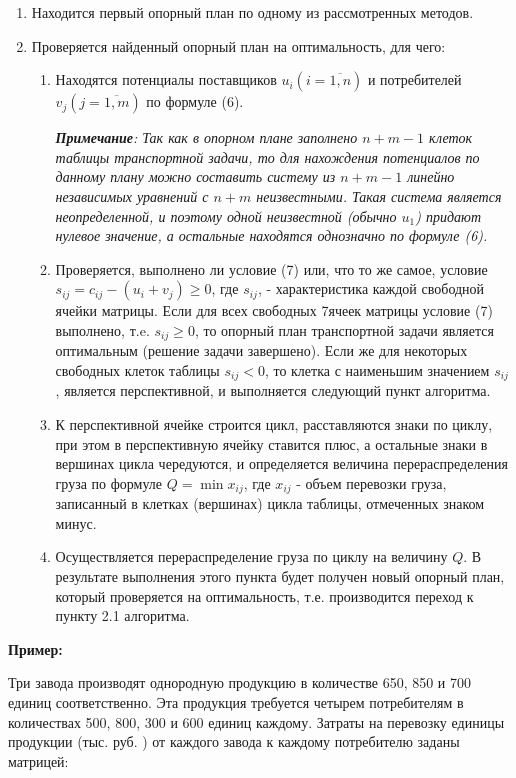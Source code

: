 \documentclass[a4paper,12pt]{article}
\begin{document}
\begin{enumerate} 
	\item Находится первый опорный план по одному из рассмотренных методов.
	\item Проверяется найденный опорный план на оптимальность, для чего:
	\begin{enumerate} 
		\item Находятся потенциалы поставщиков $u_i (i = \overline{1,n})$ и потребителей $v_j (j = \overline{1,m})$ по формуле (6).
		
		\textit{\textbf{Примечание}: Так как в опорном плане заполнено $n + m - 1$ клеток таблицы транспортной задачи, то для нахождения потенциалов по данному плану можно составить систему из $n + m - 1$ линейно независимых уравнений с $n + m$ неизвестными. Такая система является неопределенной, и поэтому одной неизвестной (обычно $u_1$) придают нулевое значение, а остальные находятся однозначно по формуле (6).}
	 
		\item Проверяется, выполнено ли условие (7) или, что то же самое, условие $s_{ij} = c_{ij} - (u_i + v_j) \geqslant 0$, где $s_{ij}$, - характеристика каждой свободной ячейки матрицы. Если для всех свободных 7ячеек матрицы условие (7) выполнено, т.e. $s_{ij} \geqslant 0$, то опорный план транспортной задачи является оптимальным (решение задачи завершено). Если же для некоторых свободных клеток таблицы $s_{ij} < 0$, то клетка с наименьшим значением $s_{ij}$, является перспективной, и выполняется следующий пункт алгоритма.
		
		\item К перспективной ячейке строится цикл, расставляются знаки по циклу, при этом в перспективную ячейку ставится плюс, а остальные знаки в вершинах цикла чередуются, и определяется величина перераспределения груза по формуле $Q = \min x_{ij}$, где $x_{ij}$ - объем перевозки груза, записанный в клетках (вершинах) цикла таблицы, отмеченных знаком минус.
		
		\item Осуществляется перераспределение груза по циклу на величину $Q$. В результате выполнения этого пункта будет получен новый опорный план, который проверяется на оптимальность, т.е. производится переход к пункту 2.1 алгоритма.
	\end{enumerate}
\end{enumerate}

\textbf{Пример:} 

Три завода производят однородную продукцию в количестве 650, 850 и 700 единиц соответственно. Эта продукция требуется четырем потребителям в количествах 500, 800, 300 и 600 единиц каждому. Затраты на перевозку единицы продукции (тыс. руб. ) от каждого завода к каждому потребителю заданы матрицей:
\end{document}
